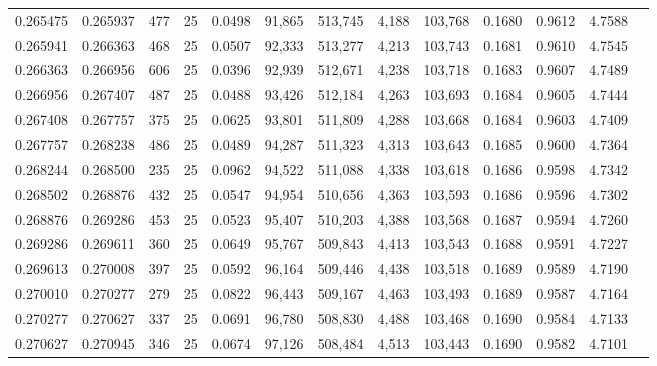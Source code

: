 \begin{tabular}{rrrrrrrrrrrrr}
0.265475 & 0.265937 &   477 &  25 &                                     0.0498 &  91,865 & 513,745 &   4,188 & 103,768 & 0.1680 & 0.9612 & 4.7588 \\
0.265941 & 0.266363 &   468 &  25 &                                     0.0507 &  92,333 & 513,277 &   4,213 & 103,743 & 0.1681 & 0.9610 & 4.7545 \\
0.266363 & 0.266956 &   606 &  25 &                                     0.0396 &  92,939 & 512,671 &   4,238 & 103,718 & 0.1683 & 0.9607 & 4.7489 \\
0.266956 & 0.267407 &   487 &  25 &                                     0.0488 &  93,426 & 512,184 &   4,263 & 103,693 & 0.1684 & 0.9605 & 4.7444 \\
0.267408 & 0.267757 &   375 &  25 &                                     0.0625 &  93,801 & 511,809 &   4,288 & 103,668 & 0.1684 & 0.9603 & 4.7409 \\
0.267757 & 0.268238 &   486 &  25 &                                     0.0489 &  94,287 & 511,323 &   4,313 & 103,643 & 0.1685 & 0.9600 & 4.7364 \\
0.268244 & 0.268500 &   235 &  25 &                                     0.0962 &  94,522 & 511,088 &   4,338 & 103,618 & 0.1686 & 0.9598 & 4.7342 \\
0.268502 & 0.268876 &   432 &  25 &                                     0.0547 &  94,954 & 510,656 &   4,363 & 103,593 & 0.1686 & 0.9596 & 4.7302 \\
0.268876 & 0.269286 &   453 &  25 &                                     0.0523 &  95,407 & 510,203 &   4,388 & 103,568 & 0.1687 & 0.9594 & 4.7260 \\
0.269286 & 0.269611 &   360 &  25 &                                     0.0649 &  95,767 & 509,843 &   4,413 & 103,543 & 0.1688 & 0.9591 & 4.7227 \\
0.269613 & 0.270008 &   397 &  25 &                                     0.0592 &  96,164 & 509,446 &   4,438 & 103,518 & 0.1689 & 0.9589 & 4.7190 \\
0.270010 & 0.270277 &   279 &  25 &                                     0.0822 &  96,443 & 509,167 &   4,463 & 103,493 & 0.1689 & 0.9587 & 4.7164 \\
0.270277 & 0.270627 &   337 &  25 &                                     0.0691 &  96,780 & 508,830 &   4,488 & 103,468 & 0.1690 & 0.9584 & 4.7133 \\
0.270627 & 0.270945 &   346 &  25 &                                     0.0674 &  97,126 & 508,484 &   4,513 & 103,443 & 0.1690 & 0.9582 & 4.7101 \\

\end{tabular}
